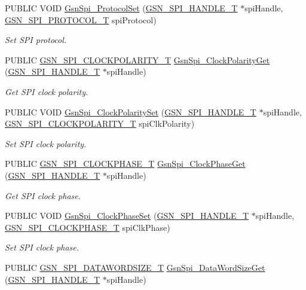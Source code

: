\begin{DoxyCompactItemize}
PUBLIC VOID \hyperlink{a00655_gadb92fa4a2bfa6792e6c62f27a2cce12f}{GsnSpi\_\-ProtocolSet} (\hyperlink{a00238}{GSN\_\-SPI\_\-HANDLE\_\-T} $\ast$spiHandle, \hyperlink{a00655_gafc404344d5f8c6a8358fa3be07a87444}{GSN\_\-SPI\_\-PROTOCOL\_\-T} spiProtocol)
\begin{DoxyCompactList}\small\item\em Set SPI protocol. \end{DoxyCompactList}\item 
PUBLIC \hyperlink{a00655_ga40c914db809ec79fd3a564dda8364aea}{GSN\_\-SPI\_\-CLOCKPOLARITY\_\-T} \hyperlink{a00655_gac08639e1b7daa7f98933d254dd4267c2}{GsnSpi\_\-ClockPolarityGet} (\hyperlink{a00238}{GSN\_\-SPI\_\-HANDLE\_\-T} $\ast$spiHandle)
\begin{DoxyCompactList}\small\item\em Get SPI clock polarity. \end{DoxyCompactList}\item 
PUBLIC VOID \hyperlink{a00655_ga46e10b008bc602521ad5c852318250fc}{GsnSpi\_\-ClockPolaritySet} (\hyperlink{a00238}{GSN\_\-SPI\_\-HANDLE\_\-T} $\ast$spiHandle, \hyperlink{a00655_ga40c914db809ec79fd3a564dda8364aea}{GSN\_\-SPI\_\-CLOCKPOLARITY\_\-T} spiClkPolarity)
\begin{DoxyCompactList}\small\item\em Set SPI clock polarity. \end{DoxyCompactList}\item 
PUBLIC \hyperlink{a00655_ga1399b803d30956e8ed6f4929033329ad}{GSN\_\-SPI\_\-CLOCKPHASE\_\-T} \hyperlink{a00655_ga4a1a93304e2ef3f80bc42a34521930a3}{GsnSpi\_\-ClockPhaseGet} (\hyperlink{a00238}{GSN\_\-SPI\_\-HANDLE\_\-T} $\ast$spiHandle)
\begin{DoxyCompactList}\small\item\em Get SPI clock phase. \end{DoxyCompactList}\item 
PUBLIC VOID \hyperlink{a00655_ga63969f626783af407abf22424c3aa6b5}{GsnSpi\_\-ClockPhaseSet} (\hyperlink{a00238}{GSN\_\-SPI\_\-HANDLE\_\-T} $\ast$spiHandle, \hyperlink{a00655_ga1399b803d30956e8ed6f4929033329ad}{GSN\_\-SPI\_\-CLOCKPHASE\_\-T} spiClkPhase)
\begin{DoxyCompactList}\small\item\em Set SPI clock phase. \end{DoxyCompactList}\item 
PUBLIC \hyperlink{a00655_ga63cbe81427185213bde26b93dde72747}{GSN\_\-SPI\_\-DATAWORDSIZE\_\-T} \hyperlink{a00655_ga409590e9bfed9d125930409befb782c5}{GsnSpi\_\-DataWordSizeGet} (\hyperlink{a00238}{GSN\_\-SPI\_\-HANDLE\_\-T} $\ast$spiHandle)

\end{DoxyCompactItemize}
